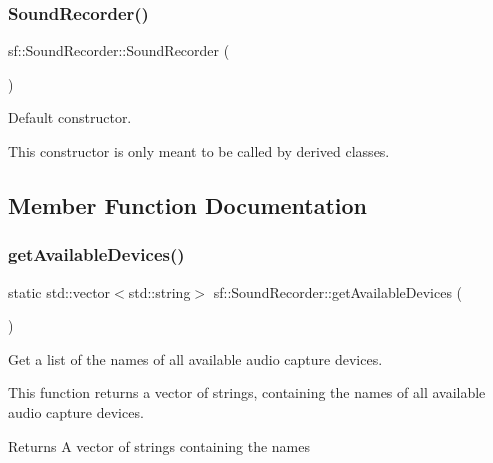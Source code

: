 \subsubsection{\texorpdfstring{Sound\+Recorder()}{SoundRecorder()}}
{\footnotesize\ttfamily sf\+::\+Sound\+Recorder\+::\+Sound\+Recorder (\begin{DoxyParamCaption}{ }\end{DoxyParamCaption})\hspace{0.3cm}{\ttfamily [protected]}}



Default constructor. 

This constructor is only meant to be called by derived classes. 

\subsection{Member Function Documentation}
\mbox{\label{classsf_1_1_sound_recorder_a26198c5c11efcd61f426f326fe314afe}} 
\subsubsection{\texorpdfstring{get\+Available\+Devices()}{getAvailableDevices()}}
{\footnotesize\ttfamily static std\+::vector$<$std\+::string$>$ sf\+::\+Sound\+Recorder\+::get\+Available\+Devices (\begin{DoxyParamCaption}{ }\end{DoxyParamCaption})\hspace{0.3cm}{\ttfamily [static]}}



Get a list of the names of all available audio capture devices. 

This function returns a vector of strings, containing the names of all available audio capture devices.

\begin{DoxyReturn}{Returns}
A vector of strings containing the names 
\end{DoxyReturn}
\mbox{\label{classsf_1_1_sound_recorder_a610e98e7a73b316ce26b7c55234f86e9}} 
